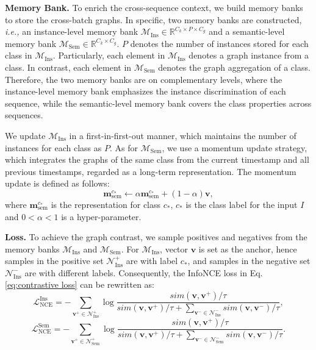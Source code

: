 \documentclass{article} \usepackage{iclr2023_conference,times}
\begin{document}
\noindent \textbf{Memory Bank.} To enrich the cross-sequence context, we build memory banks to store the cross-batch graphs. In specific, two memory banks are constructed, \emph{i.e.,} an instance-level memory bank $\mathcal{M}_\text{Ins} \in \mathbb{R}^{C_k \times P \times C_g}$ and a semantic-level memory bank $\mathcal{M}_\text{Sem} \in \mathbb{R}^{C_k \times C_g}$. $P$ denotes the number of instances stored for each class in $\mathcal{M}_\text{Ins}$. Particularly, each element in $\mathcal{M}_\text{Ins}$ denotes a graph instance from a class. In contrast, each element in $\mathcal{M}_\text{Sem}$ denotes the graph aggregation of a class. Therefore, the two memory banks are on complementary levels, where the instance-level memory bank emphasizes the instance discrimination of each sequence, while the semantic-level memory bank covers the class properties across sequences.

We update $\mathcal{M}_\text{Ins}$ in a first-in-first-out manner, which maintains the number of instances for each class as $P$. As for $\mathcal{M}_\text{Sem}$, we use a momentum update strategy, which integrates the graphs of the same class from the current timestamp and all previous timestamps, regarded as a long-term representation. The momentum update is defined as follows:
\begin{equation}
    \label{eq:momentum}
    \mathbf{m}_\text{sem}^{c_*} \gets \alpha \mathbf{m}_\text{sem}^{c_*} + (1-\alpha)\mathbf{v},
\end{equation}
where $\mathbf{m}_\text{sem}^{c_*}$ is the representation for class $c_*$, $c_*$ is the class label for the input $I$ and $0\!<\!\alpha\!<\!1$ is a hyper-parameter. 

\noindent \textbf{Loss.} To achieve the graph contrast, we sample positives and negatives from the memory banks $\mathcal{M}_\text{Ins}$ and $\mathcal{M}_\text{Sem}$. For $\mathcal{M}_\text{Ins}$, vector $\mathbf{v}$ is set as the anchor, hence samples in the positive set $\mathcal{N}_\text{Ins}^+$ are with label $c_*$, and samples in the negative set $\mathcal{N}_\text{Ins}^-$ are with different labels. Consequently, the InfoNCE loss in Eq. \ref{eq:contrastive loss} can be rewritten as:
\begin{equation}
    \mathcal{L}_\text{NCE}^\text{Ins} = -\sum_{\mathbf{v^+} \in \mathcal{N}_\text{Ins}^+}{\log{\frac{sim(\mathbf{v}, \mathbf{v^+})/\tau}{sim(\mathbf{v}, \mathbf{v^+})/\tau+\sum_{\mathbf{v^-} \in {\mathcal{N}_\text{Ins}^-}}{sim(\mathbf{v}, \mathbf{v^-})/\tau}}}},
\end{equation}
\begin{equation}
\mathcal{L}_\text{NCE}^\text{Sem} = -\sum_{\mathbf{v^+} \in \mathcal{N}_\text{Sem}^+}{\log{\frac{sim(\mathbf{v}, \mathbf{v^+})/\tau}{sim(\mathbf{v}, \mathbf{v^+})/\tau+\sum_{\mathbf{v^-} \in {\mathcal{N}_\text{Sem}^-}}{sim(\mathbf{v}, \mathbf{v^-})/\tau}}}}.
\end{equation}
\end{document}
